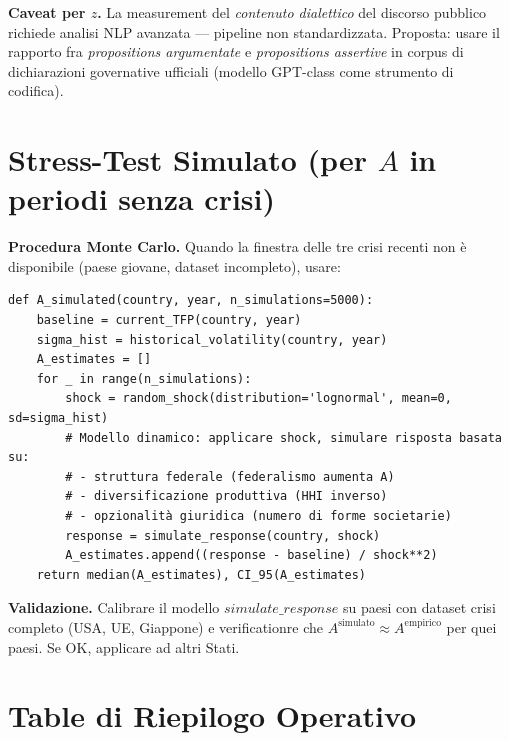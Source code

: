 \Conj{} \textbf{Caveat per \(z\).} La measurement del \emph{contenuto
dialettico} del discorso pubblico richiede analisi NLP avanzata ---
pipeline non standardizzata. Proposta: usare il rapporto fra
\emph{propositions argumentate} e \emph{propositions assertive} in
corpus di dichiarazioni governative ufficiali (modello GPT-class come
strumento di codifica).



\section{\texorpdfstring{Stress-Test Simulato (per \(A\) in periodi
senza
crisi)}{Stress-Test Simulato (per A in periodi senza crisi)}}\label{stress-test-simulato-per-a-in-periodi-senza-crisi}

\Hypoth{} \textbf{Procedura Monte Carlo.} Quando la finestra delle tre
crisi recenti non è disponibile (paese giovane, dataset incompleto),
usare:

\begin{verbatim}
def A_simulated(country, year, n_simulations=5000):
    baseline = current_TFP(country, year)
    sigma_hist = historical_volatility(country, year)
    A_estimates = []
    for _ in range(n_simulations):
        shock = random_shock(distribution='lognormal', mean=0, sd=sigma_hist)
        # Modello dinamico: applicare shock, simulare risposta basata su:
        # - struttura federale (federalismo aumenta A)
        # - diversificazione produttiva (HHI inverso)
        # - opzionalità giuridica (numero di forme societarie)
        response = simulate_response(country, shock)
        A_estimates.append((response - baseline) / shock**2)
    return median(A_estimates), CI_95(A_estimates)
\end{verbatim}

\Proved{} \textbf{Validazione.} Calibrare il modello
\(simulate\_response\) su paesi con dataset crisi completo (USA, UE,
Giappone) e verificationre che
\(A^{\text{simulato}} \approx A^{\text{empirico}}\) per quei paesi. Se
OK, applicare ad altri Stati.



\section{Table di Riepilogo
Operativo}\label{table-di-riepilogo-operational}

